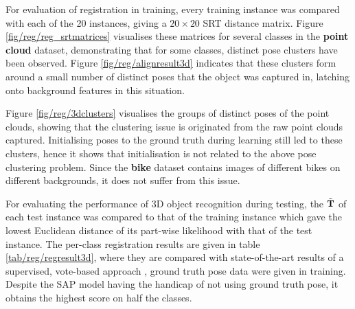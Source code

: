 For evaluation of registration in training, every training instance was compared with each of the 20 instances, giving a $20 \times 20$ SRT distance matrix. Figure \ref{fig/reg/reg_srtmatrices} visualises these matrices for several classes in the \textbf{point cloud} dataset, demonstrating that for some classes, distinct pose clusters have been observed. Figure \ref{fig/reg/alignresult3d} indicates that these clusters form around a small number of distinct poses that the object was captured in, latching onto background features in this situation. 

Figure \ref{fig/reg/3dclusters} visualises the groups of distinct poses of the point clouds, showing that the clustering issue is originated from the raw point clouds captured. Initialising poses to the ground truth during learning still led to these clusters, hence it shows that initialisation is not related to the above pose clustering problem. Since the \textbf{bike} dataset contains images of different bikes on different backgrounds, it does not suffer from this issue.

For evaluating the performance of 3D object recognition during testing, the $\tilde{\mathbf{T}}$ of each test instance was compared to that of the training instance which gave the lowest Euclidean distance of its part-wise likelihood with that of the test instance. The per-class registration results are given in table \ref{tab/reg/regresult3d}, where they are compared with state-of-the-art results of a supervised, vote-based approach \cite{Woodford2013}, \ie ground truth pose data were given in training. Despite the SAP model having the handicap of not using ground truth pose, it obtains the highest score on half the classes.

